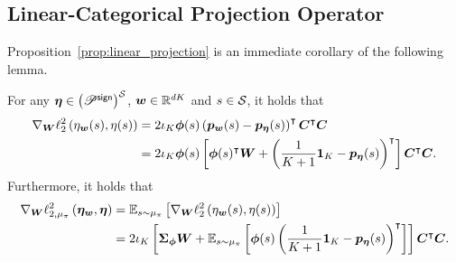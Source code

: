 \subsection{Linear-Categorical Projection Operator}\label{appendix:linear-cate-project-op}
Proposition~\ref{prop:linear_projection} is an immediate corollary of the following lemma.
\begin{lemma}\label{lem:gradient_cramer_distance}
    For any $\bm{\eta}\in\left({{\mathscr{P}}^{\mathsf{sign}}}\right)^{{\mathcal{S}}}$, ${\bm{w}}\in{\mathbb R}^{dK}$ and $s\in{\mathcal{S}}$, it holds that
    \begin{align*}
        \nabla_{{\bm{W}}} \ell_2^2\left({{\eta}_{{\bm{w}}}(s),{\eta}(s)}\right)&=2\iota_K{\bm{\phi}}(s)\left({{\bm{p}}_{{\bm{w}}}(s)-{\bm{p}}_{\bm{\eta}}(s)}\right)^{\intercal}{\bm{C}}^{\intercal}{\bm{C}}\\
        &=2\iota_K{\bm{\phi}}(s)\left[{{\bm{\phi}}(s)^{\intercal}{\bm{W}}+\left({\frac{1}{K+1}\bm{1}_{K}-{\bm{p}}_{\bm{\eta}}(s)}\right)^{\intercal}}\right]{\bm{C}}^{\intercal}{\bm{C}}.
    \end{align*}
    Furthermore, it holds that
        \begin{align*}
        \nabla_{{\bm{W}}} \ell_{2,\mu_{\pi}}^2\left({\bm{\eta}_{{\bm{w}}},\bm{\eta}}\right)&={\mathbb E}_{s\sim\mu_{\pi}}\left[{\nabla_{{\bm{W}}} \ell_2^2\left({{\eta}_{{\bm{w}}}(s),{\eta}(s)}\right)}\right]\\
        &=2\iota_K\left[{{\bm{\Sigma}}_{{\bm{\phi}}}{\bm{W}}+{\mathbb E}_{s\sim\mu_{\pi}}\left[{{\bm{\phi}}(s)\left({\frac{1}{K+1}\bm{1}_{K}-{\bm{p}}_{\bm{\eta}}(s)}\right)^{\intercal}}\right]}\right]{\bm{C}}^{\intercal}{\bm{C}}.
    \end{align*}
\end{lemma}
